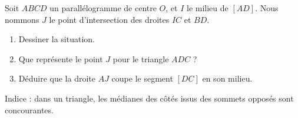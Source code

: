 
\begin{exercice}\label{exoSeconde-0045}

    Soit \( ABCD\) un parallélogramme de centre \( O\), et \( I\) le milieu de \( [AD]\). Nous nommons \( J\) le point d'intersection des droites \( IC\) et \( BD\).
    \begin{enumerate}
        \item
            Dessiner la situation.
        \item
            Que représente le point \( J\) pour le triangle \( ADC\) ? 
        \item
            Déduire que la droite \( AJ\) coupe le segment \( [DC]\) en son milieu.
    \end{enumerate}
    Indice : dans un triangle, les médianes des côtés issus des sommets opposés sont concourantes.

\end{exercice}
